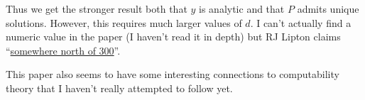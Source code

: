 Thus we get the stronger result both that \(y\) is analytic and that \(P\) admits unique solutions.
However, this requires much larger values of \(d\).
I can't actually find a numeric value in the paper (I haven't read it in depth) but RJ Lipton claims ``\href{https://rjlipton.wordpress.com/2017/08/09/modeling-reality/}{somewhere north of 300}''.

This paper also seems to have some interesting connections to computability theory that I haven't really attempted to follow yet.
